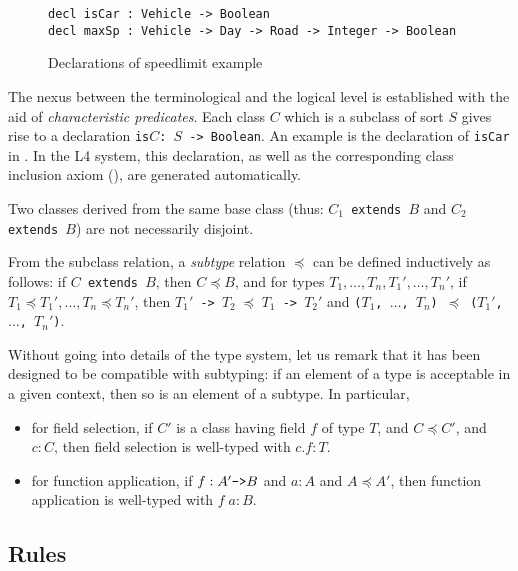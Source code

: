 \begin{figure}[h]
\begin{lstlisting}
decl isCar : Vehicle -> Boolean
decl maxSp : Vehicle -> Day -> Road -> Integer -> Boolean
\end{lstlisting}
  \caption{Declarations of speedlimit example}\label{fig:fundecls}
\end{figure}

The nexus between the terminological and the logical level is established with
the aid of \emph{characteristic predicates}. Each class $C$ which is a
subclass of sort $S$ gives rise to a declaration \texttt{is$C$: $S$ ->
  Boolean}. An example is the declaration of \texttt{isCar} in
. In the L4 system, this declaration, as well as the
corresponding class inclusion axiom (), are generated
automatically.

Two classes derived from the same base class (thus: \texttt{$C_1$ extends $B$}
and \texttt{$C_2$ extends $B$}) are not necessarily disjoint. 

From the subclass relation, a \emph{subtype} relation $\preceq$ can be defined
inductively as follows: if \texttt{$C$ extends $B$}, then $C \preceq B$, and
for types $T_1, \dots, T_n, T_1', \dots, T_n'$,
if $T_1 \preceq T_1', \dots, T_n \preceq T_n'$, 
then \texttt{$T_1'$ -> $T_2 \; \preceq \; T_1$ -> $T_2'$} 
and \texttt{($T_1$, $\dots$, $T_n$) $\preceq$ ($T_1'$, $\dots$, $T_n'$)}.

Without going into details of the type system, let us remark that it has been
designed to be compatible with subtyping: if an element of a type is
acceptable in a given context, then so is an element of a subtype. In
particular,
\begin{itemize}
\item for field selection, if $C'$ is a class having field $f$ of type $T$,
  and $C \preceq C'$, and $c : C$, then field selection is well-typed with $c.f : T$.
\item for function application, if $f: A' \mbox{\texttt{->}} B$ and $a:A$ and
  $A \preceq A'$, then function application is well-typed with $f\; a : B$.
\end{itemize}


\subsection{Rules}\label{sec:rules}

